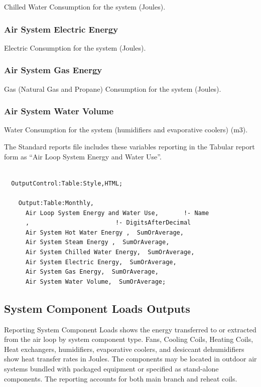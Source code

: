 Chilled Water Consumption for the system (Joules).

\subsubsection{Air System Electric Energy}\label{air-system-electric-energy}

Electric Consumption for the system (Joules).

\subsubsection{Air System Gas Energy}\label{air-system-gas-energy}

Gas (Natural Gas and Propane) Consumption for the system (Joules).

\subsubsection{Air System Water Volume}\label{air-system-water-volume}

Water Consumption for the system (humidifiers and evaporative coolers) (m3).

The Standard reports file includes these variables reporting in the Tabular report form as ``Air Loop System Energy and Water Use''.

\begin{lstlisting}

  OutputControl:Table:Style,HTML;

    Output:Table:Monthly,
      Air Loop System Energy and Water Use,       !- Name
      ,                        !- DigitsAfterDecimal
      Air System Hot Water Energy ,  SumOrAverage,
      Air System Steam Energy ,  SumOrAverage,
      Air System Chilled Water Energy,  SumOrAverage,
      Air System Electric Energy,  SumOrAverage,
      Air System Gas Energy,  SumOrAverage,
      Air System Water Volume,  SumOrAverage;
\end{lstlisting}

\subsection{System Component Loads Outputs}\label{system-component-loads-outputs}

Reporting System Component Loads shows the energy transferred to or extracted from the air loop by system component type. Fans, Cooling Coils, Heating Coils, Heat exchangers, humidifiers, evaporative coolers, and desiccant dehumidifiers show heat transfer rates in Joules. The components may be located in outdoor air systems bundled with packaged equipment or specified as stand-alone components. The reporting accounts for both main branch and reheat coils.

